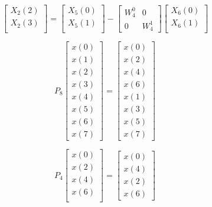 \documentclass[journal,12pt,twocolumn]{IEEEtran}
\renewcommand\thesection{\arabic{section}}
\begin{document}
\begin{enumerate}[label=\arabic*.,ref=\thesection.\theenumi]
\begin{equation}
\begin{bmatrix}
X_{2}(2) \\ 
X_{2}(3)\\ 
\end{bmatrix}
=
\begin{bmatrix}
X_{5}(0) \\ 
X_{5}(1)\\ 
\end{bmatrix}
-
\begin{bmatrix}
W^{0}_{4} & 0\\
0 & W^{1}_{4}
\end{bmatrix}
\begin{bmatrix}
X_{6}(0) \\ 
X_{6}(1) \\ 
\end{bmatrix}
\end{equation}

\begin{equation}
P_{8}
\begin{bmatrix}
x(0) \\ 
x(1) \\ 
x(2) \\ 
x(3) \\ 
x(4) \\ 
x(5) \\
x(6) \\
x(7)
\end{bmatrix}
 = 
\begin{bmatrix}
x(0) \\ 
x(2) \\ 
x(4) \\ 
x(6) \\
x(1) \\ 
x(3) \\ 
x(5) \\
x(7)
\end{bmatrix}
\end{equation}

\begin{equation}
P_{4}
\begin{bmatrix}
x(0) \\ 
x(2) \\ 
x(4) \\ 
x(6) \\
\end{bmatrix}
 = 
\begin{bmatrix}
x(0) \\ 
x(4) \\ 
x(2) \\
x(6)
\end{bmatrix}
\end{equation}


\end{enumerate}
\end{document}
